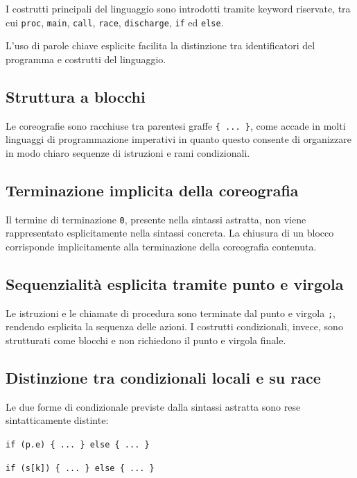 I costrutti principali del linguaggio sono introdotti tramite keyword riservate, tra cui \texttt{proc}, \texttt{main}, \texttt{call}, \texttt{race}, \texttt{discharge}, \texttt{if} ed \texttt{else}.

L’uso di parole chiave esplicite facilita la distinzione tra identificatori del programma e costrutti del linguaggio.

\subsection*{Struttura a blocchi}

Le coreografie sono racchiuse tra parentesi graffe \texttt{\{ ... \}}, come accade in molti linguaggi di programmazione imperativi in quanto questo consente di organizzare in modo chiaro sequenze di istruzioni e rami condizionali.

\subsection*{Terminazione implicita della coreografia}

Il termine di terminazione \texttt{0}, presente nella sintassi astratta, non viene rappresentato esplicitamente nella sintassi concreta. La chiusura di un blocco corrisponde implicitamente alla terminazione della coreografia contenuta.

\subsection*{Sequenzialità esplicita tramite punto e virgola}

Le istruzioni e le chiamate di procedura sono terminate dal punto e virgola \texttt{;}, rendendo esplicita la sequenza delle azioni. I costrutti condizionali, invece, sono strutturati come blocchi e non richiedono il punto e virgola finale.


\subsection*{Distinzione tra condizionali locali e su race}

Le due forme di condizionale previste dalla sintassi astratta sono rese sintatticamente distinte:

\begin{center}
\texttt{if (p.e) \{ ... \} else \{ ... \}}
\end{center}

\begin{center}
\texttt{if (s[k]) \{ ... \} else \{ ... \}}
\end{center}

